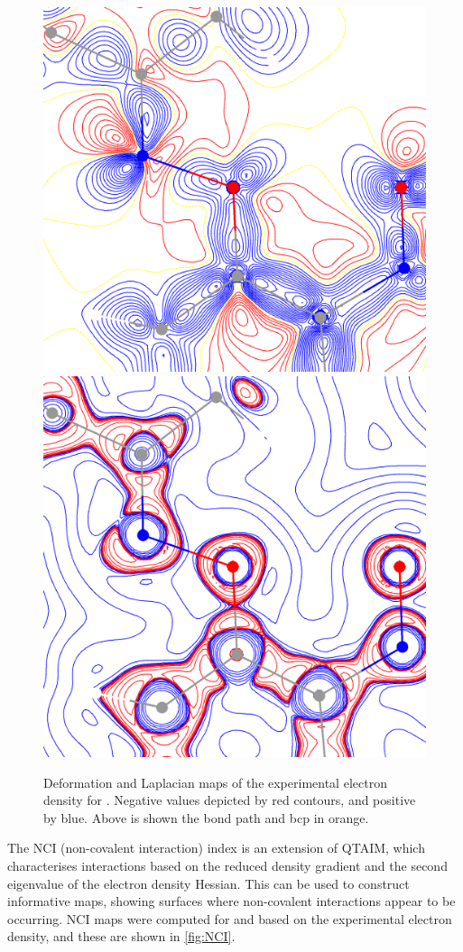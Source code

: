 \begin{refsection}
\begin{figure}
	\includegraphics[width=0.45\columnwidth]{Figures/cyclohexanone-oxime-dnp-defdens.pdf}
	\includegraphics[width=0.45\columnwidth]{Figures/cyclohexanone-oxime-dnp-lapl.pdf}
	\caption[Deformation and Laplacian maps of the electron density for .]{Deformation and Laplacian maps of the experimental electron density for . Negative values depicted by red contours, and positive by blue. Above is shown the bond path and bcp in orange.}\label{fig:lapl}
\end{figure}

The NCI (non-covalent interaction) index is an extension of QTAIM, which characterises interactions based on the reduced density gradient and the second eigenvalue of the electron density Hessian.\autocite{Johnson2010a}
This can be used to construct informative maps, showing surfaces where non-covalent interactions appear to be occurring.
NCI maps were computed for  and  based on the experimental electron density, and these are shown in \cref{fig:NCI}.


\end{refsection}
